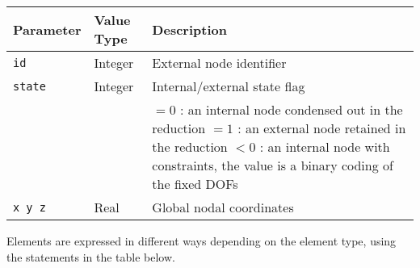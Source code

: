 \noindent
\begin{tabular}{| m{} | m{} | m{} |}
  \hline
  \rowcolor[HTML]{EFEFEF}
  Parameter   & Value Type & Description  \\
  \hline\hline
  {\tt id}    & Integer & External node identifier \\
  \hline
  {\tt state} & Integer & Internal/external state flag \\
              &         & \small%
   $=0$ : an internal node condensed out in the reduction \newline
   $=1$ : an external node retained in the reduction \newline
   $<0$ : an internal node with constraints, the value is
   \newline\mbox{}\hskip24pt a binary coding of the fixed DOFs \\
  \hline
  \texttt{x y z} &  Real & Global nodal coordinates \\
  \hline
\end{tabular}



Elements are expressed in different ways depending on the element type,
using the statements in the table below.

